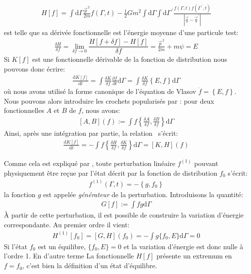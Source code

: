 \begin{align*}
	H \left[ f \right]  =
	\int \mathrm{d} {\Gamma}
		\frac{\vec{p}^{\,2}}{2m} f \left( {\Gamma},t \right)
	- \frac{1}{2} Gm^2 \int \mathrm{d} {\Gamma} \int\mathrm{d}{\Gamma}^{\,\prime}
		\frac{f \left({\Gamma},t \right) f\left( {\Gamma}^{\,\prime},t\right)}%
		{\left\vert \vec{q} - \vec{q}^{\,\prime} \right\vert }
\end{align*}
est telle que sa dérivée fonctionnelle est l'énergie moyenne d'une particule test:
\begin{align*}
	\frac{\delta H}{\delta f}=\lim_{\delta f \to 0}\dfrac{H\left[ f +\delta f\right]-H \left[ f \right]}{\delta f}
	= \frac{\vec{p}^{\,2}}{2m} + m \psi=E
\end{align*}
Si $K[f]$ est une fonctionnelle dérivable de la fonction de distribution nous pouvons donc écrire:
\begin{align}
	\frac{\mathrm{d} K[f]}{\mathrm{d} t}
	= \int \frac{\delta K}{\delta f}
		\frac{\partial f}{\partial t} \mathrm{d} \Gamma
	= \int \frac{\delta K}{\delta f} \left\{ E, f \right\} \mathrm{d} \Gamma
	\label{derivk}
\end{align}
où nous avons utilisé la forme canonique de l'équation de Vlasov $\dot f=\left\{ E, f \right\}$.
Nous pouvons alors introduire les crochets popularisés par \cite{morrison}: pour deux fonctionnelles $A$ et $B$ de $f$, nous avons:
\begin{align*}
	\left[ A, B \right](f) :=
	\int f \left\{
		\frac{\delta A}{\delta f}, \frac{\delta B}{\delta f}
	\right\} \mathrm{d} \Gamma
\end{align*}
Ainsi, après une intégration par partie, la relation~ s'écrit:
\begin{align}
	\frac{\mathrm{d} K[f]}{\mathrm{d} t}
	= - \int f \left\{
		\frac{\delta H}{\delta f}, \frac{\delta K}{\delta f}
	\right\} \mathrm{d} \Gamma
	= \left[K, H \right](f)
\end{align}

Comme cela est expliqué par \cite{kandrupstability}, toute perturbation linéaire $f^{(1)}$ pouvant physiquement être reçue par l'état décrit par la
fonction de distribution $f_0$ s'écrit:
\begin{align*}
	f^{(1)}\left(  {\Gamma},t \right) = -\left\{ g,f_{0}\right\}
\end{align*}
la fonction $g$ est appelée \emph{générateur} de la perturbation. Introduisons la quantité:
\begin{align*}
	G[f] := \int f g \mathrm{d} \Gamma
\end{align*}
À partir de cette perturbation, il est possible de construire la variation d'énergie correspondante. Au  premier ordre il vient:
\begin{align*}
	H^{(1)} [f_0] = \left[G, H \right](f_0)
	= - \int g \{ f_0, E \} \mathrm{d} \Gamma
	= 0
\end{align*}
Si l'état $f_0$ est un équilibre, $\{ f_0, E \} = 0$ et la variation d'énergie est donc nulle à l'ordre 1. En d'autre terme La fonctionnelle $H[f]$
présente un extremum en $f=f_0$, c'est bien la définition d'un état d'équilibre.

